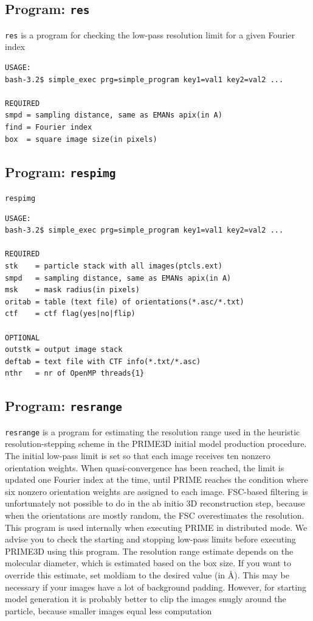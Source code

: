 \documentclass[a4paper,11pt]{article}
\newcommand{\prgname}[1]{\textcolor{NavyBlue}{\texttt{#1}}}
\begin{document}
\subsection{Program: \prgname{res}}
\label{res}
\prgname{res} is a program for checking the low-pass resolution limit for a given Fourier index

\begin{verbatim}
USAGE:
bash-3.2$ simple_exec prg=simple_program key1=val1 key2=val2 ...

REQUIRED
smpd = sampling distance, same as EMANs apix(in A)
find = Fourier index
box  = square image size(in pixels)
\end{verbatim}

\subsection{Program: \prgname{respimg}}
\label{respimg}
\prgname{respimg}  

\begin{verbatim}
USAGE:
bash-3.2$ simple_exec prg=simple_program key1=val1 key2=val2 ...

REQUIRED
stk    = particle stack with all images(ptcls.ext)
smpd   = sampling distance, same as EMANs apix(in A)
msk    = mask radius(in pixels)
oritab = table (text file) of orientations(*.asc/*.txt)
ctf    = ctf flag(yes|no|flip)

OPTIONAL
outstk = output image stack
deftab = text file with CTF info(*.txt/*.asc)
nthr   = nr of OpenMP threads{1}
\end{verbatim}

\subsection{Program: \prgname{resrange}}
\label{resrange}
\prgname{resrange} is a program for estimating the resolution range used in the heuristic resolution-stepping scheme in the PRIME3D initial model production procedure. The initial low-pass limit is set so that each image receives ten nonzero orientation weights. When quasi-convergence has been reached, the limit is updated one Fourier index at the time, until PRIME reaches the condition where six nonzero orientation weights are assigned to each image. FSC-based filtering is unfortunately not possible to do in the ab initio 3D reconstruction step, because when the orientations are mostly random, the FSC overestimates the resolution. This program is used internally when executing PRIME in distributed mode. We advise you to check the starting and stopping low-pass limits before executing PRIME3D using this program. The resolution range estimate depends on the molecular diameter, which is estimated based on the box size. If you want to override this estimate, set moldiam to the desired value (in \AA{}). This may be necessary if your images have a lot of background padding. However, for starting model generation it is probably better to clip the images snugly around the particle, because smaller images equal less computation
\end{document}
